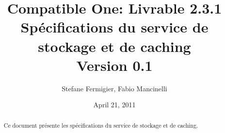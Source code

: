 \documentclass[a4paper,11pt]{article}
\title{Compatible One: Livrable 2.3.1\\
Spécifications du service de stockage et de caching\\
Version 0.1}
\date{April 21, 2011}
\author{Stefane Fermigier, Fabio Mancinelli}
\begin{document}
\maketitle
\tableofcontents

\pagebreak

\begin{abstract}
  Ce document présente les spécifications du service de stockage et de caching.
\end{abstract}


\end{document}
